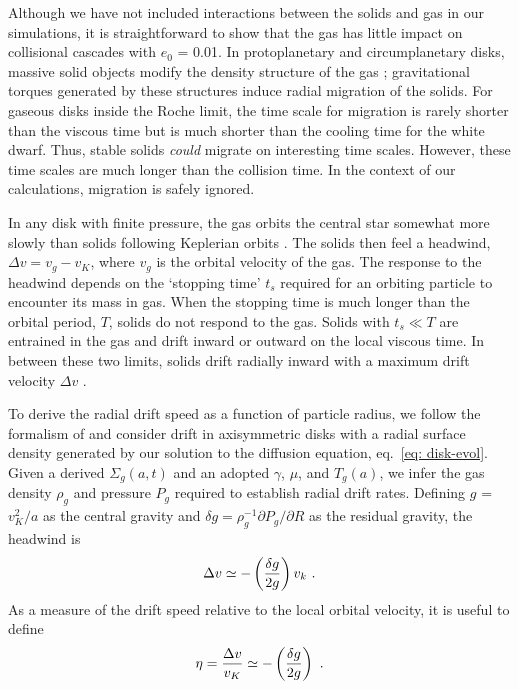 \documentclass[12pt,preprint]{aastex}
\begin{document}
Although we have not included interactions between the solids and gas in our simulations,
it is straightforward to show that the gas has little impact on collisional cascades with
$e_0$ = 0.01. In protoplanetary and circumplanetary disks, massive solid objects modify 
the density structure of the gas \citep[e.g.,][and references therein]{ward1997,tanaka2002,
masset2003,nelson2004,ida2008a,lyra2010,bk2011b,bk2013}; gravitational torques generated 
by these structures induce radial migration of the solids. For gaseous disks inside the 
Roche limit, the time scale for migration is rarely shorter than the viscous time but is
much shorter than the cooling time for the white dwarf. Thus, stable solids \textit{could} 
migrate on interesting time scales.  However, these time scales are much longer than the 
collision time. In the context of our calculations, migration is safely ignored.

In any disk with finite pressure, the gas orbits the central star somewhat more slowly than
solids following Keplerian orbits \citep[e.g.,][and references therein]{ada1976,weiden1977a,
youdin2004a,youdin2010,youdin2013}. The solids then feel a headwind, $\Delta v = v_g - v_K$,
where $v_g$ is the orbital velocity of the gas. The
response to the headwind depends on the `stopping time' $t_s$ required for an orbiting 
particle to encounter its mass in gas. When the stopping time is much longer than the orbital 
period, $T$, solids do not respond to the gas. Solids with $t_s \ll T$ are entrained in the 
gas and drift inward or outward on the local viscous time. In between these two limits, solids 
drift radially inward with a maximum drift velocity $\Delta v$ \citep{ada1976,weiden1977a}.

To derive the radial drift speed as a function of particle radius, we follow the
formalism of \citet{weiden1977a} and consider drift in axisymmetric disks with a
radial surface density generated by our solution to the diffusion equation, 
eq.~\ref{eq: disk-evol}.  Given a derived $\Sigma_g(a, t)$ and an adopted $\gamma$, 
$\mu$, and $T_g(a)$, we infer the gas density $\rho_g$ and pressure $P_g$ required 
to establish radial drift rates. Defining $g$ = $v_K^2 / a$ as the central gravity and 
$\delta g = \rho_g^{-1} \partial P_g / \partial R$ as the residual gravity, the 
headwind is \citep{weiden1977a}
\begin{equation}
\Delta v \simeq - \left ( {\delta g \over {2 g} } \right ) v_k ~ . 
\label{eq: deltav} 
\end{equation}
As a measure of the drift speed relative to the local orbital velocity, it is useful
to define 
\begin{equation}
\eta = {\Delta v \over v_K} \simeq - \left ( { \delta g \over {2 g} } \right ) ~ .
\label{eq: eta}
\end{equation}
\end{document}
